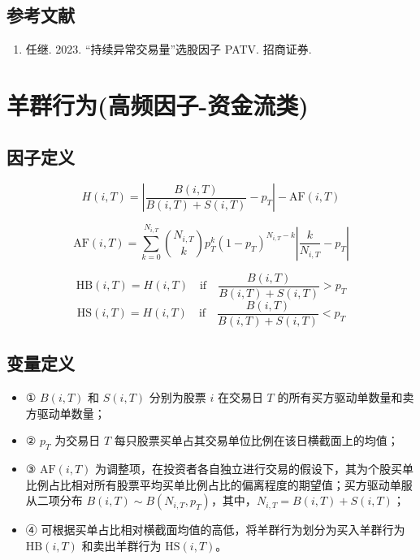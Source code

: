 \documentclass{article}
\begin{document}
\subsection{参考文献}
\begin{enumerate}
    \item 任继. 2023. “持续异常交易量”选股因子 PATV. 招商证券.
\end{enumerate}

\section{羊群行为(高频因子-资金流类)}

\subsection{因子定义}

\begin{equation}
    H(i, T) = \left| \frac{B(i, T)}{B(i, T) + S(i, T)} - p_T \right| - \mathrm{AF}(i, T)
\end{equation}

\begin{equation}
    \mathrm{AF}(i, T) = \sum_{k=0}^{N_{i,T}} \binom{N_{i,T}}{k} p_T^k (1 - p_T)^{N_{i,T}-k} \left| \frac{k}{N_{i,T}} - p_T \right|
\end{equation}

\begin{equation}
    \mathrm{HB}(i, T) = H(i, T) \quad \text{if} \quad \frac{B(i, T)}{B(i, T) + S(i, T)} > p_T
\end{equation}
\begin{equation}
    \mathrm{HS}(i, T) = H(i, T) \quad \text{if} \quad \frac{B(i, T)}{B(i, T) + S(i, T)} < p_T
\end{equation}

\subsection{变量定义}
\begin{itemize}
    \item ① \( B(i, T) \) 和 \( S(i, T) \) 分别为股票 \( i \) 在交易日 \( T \) 的所有买方驱动单数量和卖方驱动单数量；
    \item ② \( p_T \) 为交易日 \( T \) 每只股票买单占其交易单位比例在该日横截面上的均值；
    \item ③ \( \mathrm{AF}(i, T) \) 为调整项，在投资者各自独立进行交易的假设下，其为个股买单比例占比相对所有股票平均买单比例占比的偏离程度的期望值；买方驱动单服从二项分布 \( B(i, T) \sim B(N_{i,T}, p_T) \)，其中，\( N_{i,T} = B(i, T) + S(i, T) \)；
    \item ④ 可根据买单占比相对横截面均值的高低，将羊群行为划分为买入羊群行为 \( \mathrm{HB}(i, T) \) 和卖出羊群行为 \( \mathrm{HS}(i, T) \)。
\end{itemize}
\end{document}
